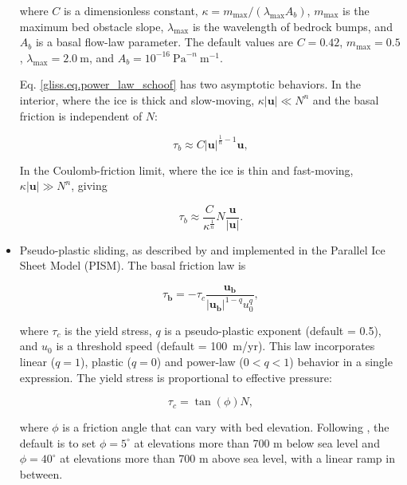 \begin{itemize}
\noindent
where $C$ is a dimensionless constant, $\kappa ={{m}_{\max }}/({{\lambda }_{\max }}{{A}_{b}})$,
$m_{\max}$ is the maximum bed obstacle slope, $\lambda_{\max}$ is the wavelength of bedrock bumps,
and $A_b$ is a basal flow-law parameter.
The default values are $C = 0.42$, $m_{\max} = 0.5$, $\lambda_{\max} = 2.0~\mathrm{m}$,
and $A_b = 10^{-16}~\mathrm{Pa}^{-n}~\mathrm{m}^{-1}$.

Eq. \eqref{gliss.eq.power_law_schoof} has two asymptotic behaviors.
In the interior, where the ice is thick and slow-moving, 
$\kappa \left| \mathbf{u} \right|\ll {{N}^{n}}$ and the basal friction
is independent of $N$:

\begin{equation}
  {{\tau }_{b}}\approx C{{\left| \mathbf{u} \right|}^{\frac{1}{n}-1}} \mathbf{u},
\end{equation}

\noindent
In the Coulomb-friction limit, where the ice is thin and fast-moving, 
$\kappa \left| \mathbf{u} \right|\gg {{N}^{n}}$, giving 

\begin{equation}
  {{\tau }_{b}}\approx \frac{C}{{{\kappa }^{\frac{1}{n}}}}N\frac{\mathbf{u}}{\left| \mathbf{u} \right|}.
\end{equation}

\item Pseudo-plastic sliding, as described by \citet{Aschwanden2013} and implemented in the
Parallel Ice Sheet Model (PISM). The basal friction law is

\begin{equation}
  {{\tau }_{\mathbf{b}}} = -{{\tau }_{c}}\frac{{{\mathbf{u}}_{\mathbf{b}}}}{{{\left| {{\mathbf{u}}_{\mathbf{b}}} \right|}^{1-q}}u_{0}^{q}},
\end{equation}

\noindent
where $\tau_c$ is the yield stress, $q$ is a pseudo-plastic exponent (default = 0.5), 
and $u_0$ is a threshold speed (default = 100~m/yr).
This law incorporates linear ($q = 1$), plastic ($q = 0$) and power-law ($0 < q < 1$) behavior in
a single expression.
The yield stress is proportional to effective pressure:

\begin{equation}
  \tau_c = \tan (\phi) N,
\end{equation}

\noindent
where $\phi$ is a friction angle that can vary with bed elevation.
Following \citet{Aschwanden2016}, the default is to set $\phi = 5^\circ$ at elevations
more than 700 m below sea level and $\phi = 40^\circ$ at elevations more than 700 m above
sea level, with a linear ramp in between.

\end{itemize}

